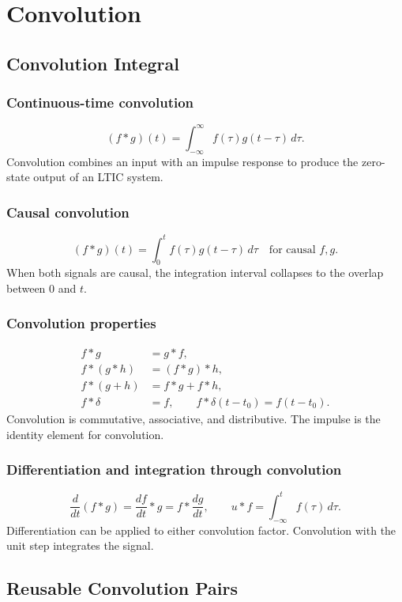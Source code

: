 \section{Convolution}

\subsection{Convolution Integral}

\subsubsection{Continuous-time convolution}
\[
(f*g)(t)=\int_{-\infty}^{\infty}f(\tau)g(t-\tau)\,d\tau.
\]
Convolution combines an input with an impulse response to produce the zero-state output of an LTIC system.

\subsubsection{Causal convolution}
\[
(f*g)(t)=\int_{0}^{t}f(\tau)g(t-\tau)\,d\tau
\quad \text{for causal }f,g.
\]
When both signals are causal, the integration interval collapses to the overlap between \(0\) and \(t\).

\subsubsection{Convolution properties}
\[
\begin{aligned}
f*g &= g*f,\\
f*(g*h)&=(f*g)*h,\\
f*(g+h)&=f*g+f*h,\\
f*\delta&=f,\qquad f*\delta(t-t_0)=f(t-t_0).
\end{aligned}
\]
Convolution is commutative, associative, and distributive. The impulse is the identity element for convolution.

\subsubsection{Differentiation and integration through convolution}
\[
\frac{d}{dt}(f*g)=\frac{df}{dt}*g=f*\frac{dg}{dt}, \qquad
u*f=\int_{-\infty}^{t}f(\tau)\,d\tau.
\]
Differentiation can be applied to either convolution factor. Convolution with the unit step integrates the signal.

\subsection{Reusable Convolution Pairs}

